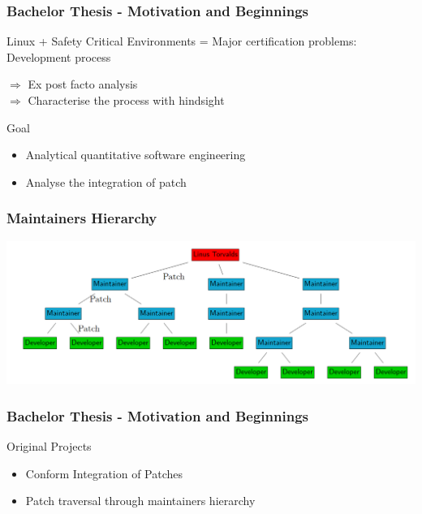 \documentclass{beamer}
\begin{document}

	\begin{frame}
	\frametitle{Bachelor Thesis - Motivation and Beginnings}
		\begin{block}{Linux + Safety Critical Environments}
			= Major certification problems: Development process
		\end{block}
		$\Rightarrow$ Ex post facto analysis\\ %
		$\Rightarrow$ Characterise the process with hindsight

		\begin{alertblock}{Goal}
			\begin{itemize}
				\item Analytical quantitative software engineering
				\item Analyse the integration of patch
			\end{itemize}
		\end{alertblock}
	\end{frame}

	

	\begin{frame}
	\frametitle{Maintainers Hierarchy}
     		\includegraphics[width=1.0\textwidth]{pics/maintainers_hierarchy.png}
	\end{frame}


	\begin{frame}
	\frametitle{Bachelor Thesis - Motivation and Beginnings}
		\begin{block}{Original Projects}
			\begin{itemize}
				\item Conform Integration of Patches
				\item Patch traversal through maintainers hierarchy
			\end{itemize}
		\end{block}
	\end{frame}
\end{document}
